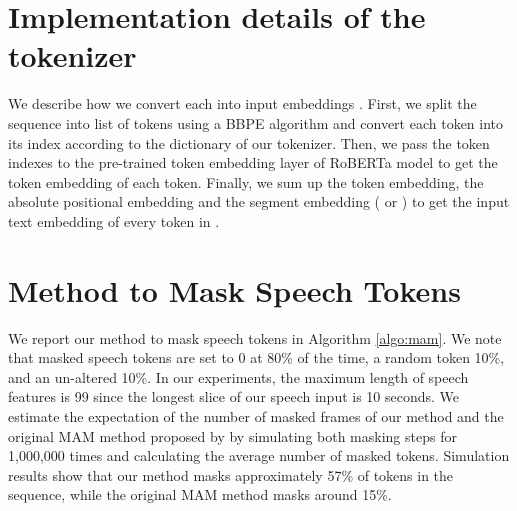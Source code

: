 \documentclass[11pt]{article}
\begin{document}
\section{Implementation details of the tokenizer}
\label{sec:a2}
We describe how we convert each  into input embeddings . First, we split the sequence  into list of tokens using a BBPE algorithm \cite{radford2019language} and convert each token into its index according to the dictionary of our tokenizer. Then, we pass the token indexes to the pre-trained token embedding layer of RoBERTa model to get the token embedding of each token. Finally, we sum up the token embedding, the absolute positional embedding and the segment embedding ( or ) to get the input text embedding of every token in .

\section{Method to Mask Speech Tokens}
\label{sec:a1}

We report our method to mask speech tokens in Algorithm \ref{algo:mam}. We note that masked speech tokens are set to 0 at 80\% of the time, a random token 10\%, and an un-altered 10\%. In our experiments, the maximum length of speech features  is 99 since the longest slice of our speech input is 10 seconds. We estimate the expectation of the number of masked frames of our method and the original MAM method proposed by \citet{Liu_2020} by simulating both masking steps for 1,000,000 times and calculating the average number of masked tokens. Simulation results show that our method masks approximately 57\% of tokens in the sequence, while the original MAM method masks around 15\%.
\end{document}
